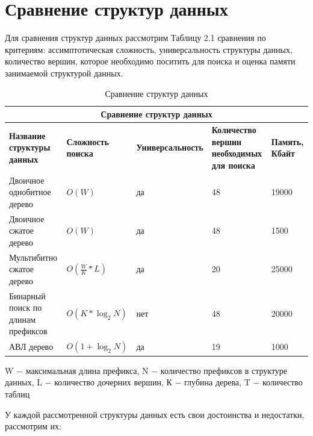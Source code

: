 \documentclass[a4peper, 12pt, titlepage, finall]{report}
\begin{document}
    \section{Сравнение структур данных}
        Для сравнения структур данных рассмотрим Таблицу 2.1 сравнения по критериям: ассимптотическая сложность, универсальность структуры данных,
        количество вершин, которое необходимо поситить для поиска и оценка памяти занимаемой структурой данных. 
        \begin{table}[ht]
            \begin{tabular}{|m{3cm}|m{2.5cm}|m{3.5cm}|m{4cm}|m{3.2cm}|}
                \hline
                \multicolumn{5}{|c|}{Сравнение структур данных}\\
                \hline
                \bf Название структуры данных     & \bf Сложность поиска & \bf Универсальность & \bf Количество вершин необходимых для поиска & \bf Память, Кбайт \\
                \hline
                Двоичное однобитное дерево & $O(W)$ & да & 48 & 19000 \\
                \hline
                Двоичное сжатое дерево & $O(W)$ & да & 48 & 1500 \\
                \hline
                Мультибитно сжатое дерево & $O(\frac{W}{K}*L)$ & да & 20 & 25000 \\
                \hline
                Бинарный поиск по длинам префиксов & $O(K*\log_2{N})$ & нет & 48 & 20000 \\
                \hline
                АВЛ дерево & $O(1 + \log_2{N})$ & да & 19 & 1000 \\
                \hline
            \end{tabular}
            \caption{Сравнение структур данных}
            {\ttfamily W $-$ максимальная длина префикса, N $-$ количество префиксов в структуре данных, L $-$ количество дочерних вершин, К $-$ глубина дерева, T $-$ количество таблиц}
        \end{table}
        У каждой рассмотренной структуры данных есть свои достоинства и недостатки, рассмотрим их:
\end{document}

